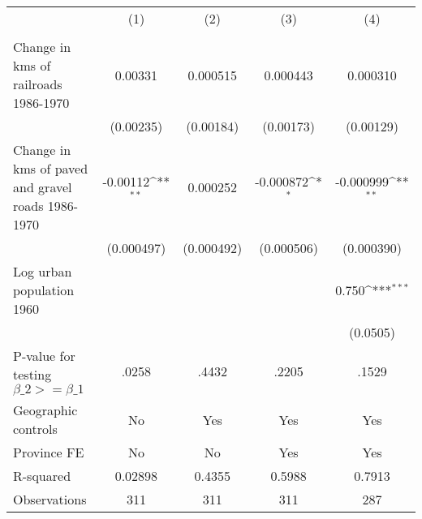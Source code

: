 {
\def\sym#1{\ifmmode^{#1}\else\(^{#1}\)\fi}
\begin{tabular}{l*{4}{c}}
\hline\hline
                &\multicolumn{1}{c}{(1)}&\multicolumn{1}{c}{(2)}&\multicolumn{1}{c}{(3)}&\multicolumn{1}{c}{(4)}\\
                &\multicolumn{1}{c}{}&\multicolumn{1}{c}{}&\multicolumn{1}{c}{}&\multicolumn{1}{c}{}\\
\hline
Change in kms of railroads 1986-1970&  0.00331         & 0.000515         & 0.000443         & 0.000310         \\
                &(0.00235)         &(0.00184)         &(0.00173)         &(0.00129)         \\
[1em]
Change in kms of paved and gravel roads 1986-1970& -0.00112\sym{**} & 0.000252         &-0.000872\sym{*}  &-0.000999\sym{**} \\
                &(0.000497)         &(0.000492)         &(0.000506)         &(0.000390)         \\
[1em]
Log urban population 1960&                  &                  &                  &    0.750\sym{***}\\
                &                  &                  &                  & (0.0505)         \\
\hline
P-value for testing $\beta\_{2} >= \beta\_{1}$&    .0258         &    .4432         &    .2205         &    .1529         \\
Geographic controls&       No         &      Yes         &      Yes         &      Yes         \\
Province FE     &       No         &       No         &      Yes         &      Yes         \\
R-squared       &  0.02898         &   0.4355         &   0.5988         &   0.7913         \\
Observations    &      311         &      311         &      311         &      287         \\
\hline\hline
\end{tabular}
}

